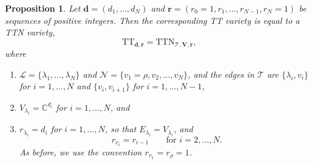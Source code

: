 \documentclass[12pt]{article}
\newtheorem{proposition}[theorem]{Proposition}
\theoremstyle{definition}
\numberwithin{theorem}{section}
\newcommand{\CC}{\mathbb{C}}
\begin{document}
\begin{proposition}\label{prop:TT_is_TTN}
Let $\mathbf{d}=(d_1, \ldots, d_N)$ and $\mathbf{r} = (r_0=1, r_1, \ldots, r_{N-1},r_N=1)$ be sequences of positive integers. Then the corresponding TT variety is equal to a TTN variety,
$$ \mathrm{TT}_{\mathbf{d}, \mathbf{r}} = \mathrm{TTN}_{\mathscr{T}, \mathbf{V},\mathbf{r}},$$
where 
\begin{enumerate}
\item $\mathscr{L} = \{\lambda_1,\ldots, \lambda_N\}$ and $\mathscr{N} = \{v_1=\rho, v_2, \ldots, v_N\}$, and the edges in $\mathscr{T}$ are  $\{\lambda_i, v_i\}$ 
for $i=1, \ldots, N$ and $\{v_i, v_{i+1}\}$ for $i=1,\ldots, N-1$,
\item $V_{\lambda_i} = \CC^{d_i}$ for $i=1,\ldots, N$, and
\item $r_{\lambda_i}=d_i$ for $i=1,\ldots,N$, so that
$E_{\lambda_i}=V_{\lambda_i}$, and
\[
r_{v_i}=r_{i-1}
\qquad
\text{for }i=2,\ldots,N.
\]
As before, we use the convention $r_{v_1}=r_\rho=1$.

\end{enumerate}
\end{proposition}
\end{document}
